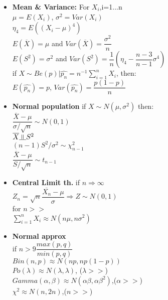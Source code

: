 \documentclass[a4paper, 10pt, landscape]{article}
\begin{document}
\begin{multicols*}{4}
\begin{itemize}
\item{\textbf{Mean \& Variance:} For $X_i$,i=1...n \\ \textbullet $\mu=E(X_i)$, $\sigma^2=Var(X_i)$ \\ \textbullet $\eta_4 = E((X_i-\mu)^4)$ \\ \textbullet $E(\overline{X})=\mu$ and $Var(\overline{X})=\dfrac{\sigma^2}{n}$ \\ \textbullet $E(S^2)=\sigma^2$ and $Var(S^2)=\dfrac{1}{n}\left( \eta_4 - \dfrac{n-3}{n-1}\sigma^4 \right)$ \\ \textbullet if $X\sim Be(p)|\hat{p_n} = n^{-1}\displaystyle{\sum_{i=1}^n X_i}$, then: \\ \textbullet $E(\hat{p_n})=p$, $Var(\hat{p_n})=\dfrac{p(1-p)}{n}$}
\item{\textbf{Normal population} if $X\sim N(\mu, \sigma^2)$ then: \\ \textbullet $\dfrac{\overline{X}-\mu }{\sigma /\sqrt{n}} \sim N(0,1)$ \\ \textbullet $\overline{X} \indep S^2$ \\ \textbullet $(n-1)S^2/\sigma^2 \sim \chi^2_{n-1}$ \\ \textbullet $\dfrac{\overline{X}-\mu }{S /\sqrt{n}} \sim t_{n-1}$}
\item{\textbf{Central Limit th.} if $n\Rightarrow \infty$\\ \textbullet $Z_n = \sqrt{n}\dfrac{\overline{X_n}-\mu}{\sigma} \Rightarrow Z \sim N(0,1)$ \\ for $n>>$ \\ \textbullet $\displaystyle{\sum^n_{i=1} X_i \approx N(n\mu , n\sigma^2)}$}
\item{\textbf{Normal approx } \\ if $n>9\dfrac{max(p,q)}{min(p,q)}$ \\ \textbullet $Bin(n,p)\approx N(np,np(1-p))$ \\ \textbullet $Po(\lambda) \approx N(\lambda , \lambda)$, ($\lambda>>$) \\ \textbullet $Gamma(\alpha, \beta) \approx N(\alpha \beta , \alpha \beta ^2)$,($\alpha >>$) \\ \textbullet $\chi^2 \approx N(n,2n)$,($n>>$)}
\end{itemize}


\end{multicols*}
\end{document}

